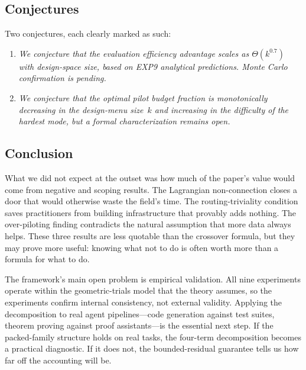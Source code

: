 \documentclass[twoside,11pt]{article}
\begin{document}
\subsection{Conjectures}

Two conjectures, each clearly marked as such:

\begin{enumerate}
\item \emph{We conjecture that the evaluation efficiency advantage scales as $\Theta(k^{0.7})$ with design-space size, based on EXP9 analytical predictions.
Monte Carlo confirmation is pending.}

\item \emph{We conjecture that the optimal pilot budget fraction is monotonically decreasing in the design-menu size~$k$ and increasing in the difficulty of the hardest mode, but a formal characterization remains open.}
\end{enumerate}

\subsection{Conclusion}

What we did not expect at the outset was how much of the paper's value would come from negative and scoping results.
The Lagrangian non-connection closes a door that would otherwise waste the field's time.
The routing-triviality condition saves practitioners from building infrastructure that provably adds nothing.
The over-piloting finding contradicts the natural assumption that more data always helps.
These three results are less quotable than the crossover formula, but they may prove more useful: knowing what not to do is often worth more than a formula for what to do.

The framework's main open problem is empirical validation.
All nine experiments operate within the geometric-trials model that the theory assumes, so the experiments confirm internal consistency, not external validity.
Applying the decomposition to real agent pipelines---code generation against test suites, theorem proving against proof assistants---is the essential next step.
If the packed-family structure holds on real tasks, the four-term decomposition becomes a practical diagnostic.
If it does not, the bounded-residual guarantee tells us how far off the accounting will be.

\end{document}
